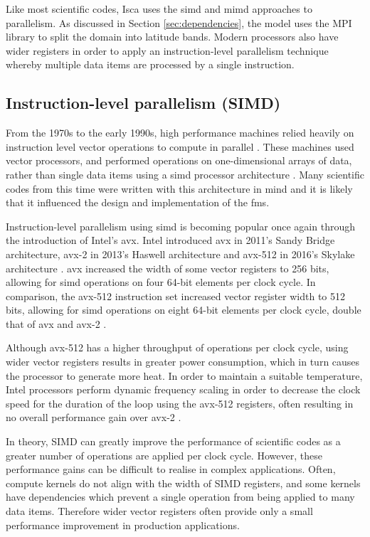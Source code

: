 \documentclass[a4paper,11pt]{report}
\begin{document}
\par
Like most scientific codes, Isca uses the \gls{simd} and \gls{mimd} approaches to parallelism. As discussed in Section \ref{sec:dependencies}, the model uses the MPI library to split the domain into latitude bands. Modern processors also have wider registers in order to apply an instruction-level parallelism technique whereby multiple data items are processed by a single instruction. 

\subsection{Instruction-level parallelism (SIMD)}
From the 1970s to the early 1990s, high performance machines relied heavily on instruction level vector operations to compute in parallel \cite{6877473}. These machines used vector processors, and performed operations on one-dimensional arrays of data, rather than single data items using a \gls{simd} processor architecture \cite{conte2000long}. Many scientific codes from this time were written with this architecture in mind and it is likely that it influenced the design and implementation of the \gls{fms}. 
\par
Instruction-level parallelism using \gls{simd} is becoming popular once again through the introduction of Intel's \gls{avx}. Intel introduced \gls{avx} in 2011's Sandy Bridge architecture, \gls{avx}-2 in 2013's Haswell architecture and \gls{avx}-512 in 2016's Skylake architecture \cite{chris2011avx, intel2019avx}. \gls{avx} increased the width of some vector registers to 256 bits, allowing for \gls{simd} operations on four 64-bit elements per clock cycle. In comparison, the \gls{avx}-512 instruction set increased vector register width to 512 bits, allowing for \gls{simd} operations on eight 64-bit elements per clock cycle, double that of \gls{avx} and \gls{avx}-2 \cite{chris2011avx,xeon2680v4}.
\par
Although \gls{avx}-512 has a higher throughput of operations per clock cycle, using wider vector registers results in greater power consumption, which in turn causes the processor to generate more heat. In order to maintain a suitable temperature, Intel processors perform dynamic frequency scaling in order to decrease the clock speed for the duration of the loop using the \gls{avx}-512 registers, often resulting in no overall performance gain over \gls{avx}-2 \cite{gottschlag2018mechanism}.
\par
In theory, SIMD can greatly improve the performance of scientific codes as a greater number of operations are applied per clock cycle. However, these performance gains can be difficult to realise in complex applications. Often, compute kernels do not align with the width of SIMD registers, and some kernels have dependencies which prevent a single operation from being applied to many data items. Therefore wider vector registers often provide only a small performance improvement in production applications.
\par
\end{document}
